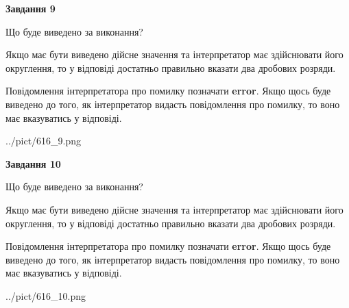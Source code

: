 \documentclass[12pt, ukrainian]{article}
\begin{document}
{\begin {Large}
{\begin {center}\textbf{Завдання 9}\end {center}}\par
Що буде виведено за виконання? \par

Якщо має бути виведено дійсне значення та інтерпретатор має здійснювати його округлення, 
то у відповіді достатньо правильно вказати два дробових розряди.

Повідомлення інтерпретатора про помилку позначати \textbf{error}.
Якщо щось буде виведено до того, як інтерпретатор видасть повідомлення про помилку, 
то воно має вказуватись у відповіді. \par

\begin{center}
	{../pict/616_9.png}
\end{center}
\newpage

{\begin {center}\textbf{Завдання 10}\end {center}}\par
Що буде виведено за виконання? \par

Якщо має бути виведено дійсне значення та інтерпретатор має здійснювати його округлення, 
то у відповіді достатньо правильно вказати два дробових розряди.

Повідомлення інтерпретатора про помилку позначати \textbf{error}.
Якщо щось буде виведено до того, як інтерпретатор видасть повідомлення про помилку, 
то воно має вказуватись у відповіді. \par

\begin{center}
	{../pict/616_10.png}
\end{center}
\newpage

\end {Large}}
\end{document}
